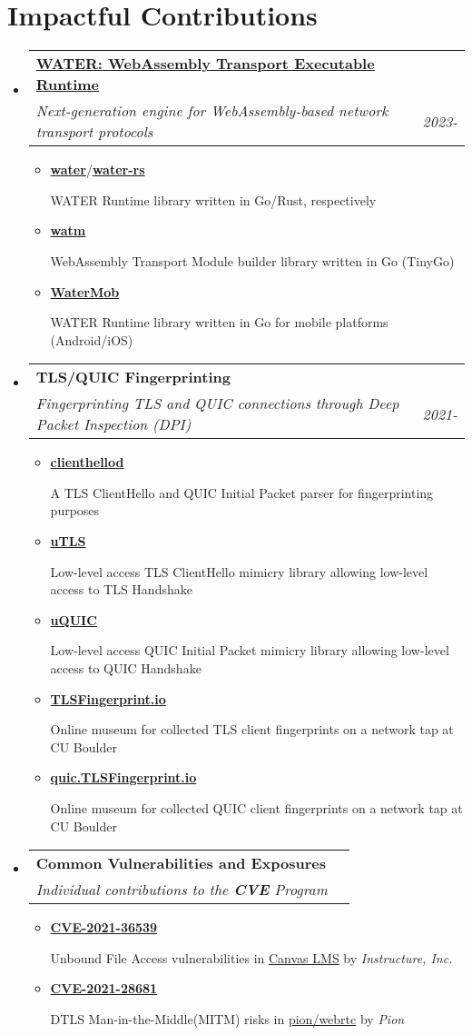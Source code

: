 \documentclass[letterpaper,11pt]{article}
\makeatletter
\newcommand{\resumeItem}[1]{
  \item\small{
    {#1 \vspace{-2pt}}
  }
}
\newcommand{\resumeSubheading}[4]{
  \vspace{-2pt}\item
    \begin{tabular*}{0.97\textwidth}[t]{l@{\extracolsep{\fill}}r}
      \textbf{#1} & #2 \\
      \textit{\small#3} & \textit{\small #4} \\
    \end{tabular*}\vspace{-7pt}
}
\newcommand{\resumeSubHeadingListStart}{\begin{itemize}[leftmargin=0.15in, label={}]}
\newcommand{\resumeSubHeadingListEnd}{\end{itemize}}
\newcommand{\resumeItemListStart}{\begin{itemize}}
\newcommand{\resumeItemListEnd}{\end{itemize}\vspace{-5pt}}
\makeatother
\begin{document}
\section{Impactful Contributions}
\resumeSubHeadingListStart
\resumeSubheading
{\href{https://github.com/refraction-networking/water}{\textbf{WATER: WebAssembly Transport Executable Runtime}}}{}
{Next-generation engine for WebAssembly-based network transport protocols}{2023-}
\resumeItemListStart
  \resumeItem{\href{https://github.com/refraction-networking/water}{\textbf{water}}/\href{https://github.com/refraction-networking/water-rs}{\textbf{water-rs}}}
    {WATER Runtime library written in Go/Rust, respectively}
  \resumeItem{\href{https://github.com/refraction-networking/watm}{\textbf{watm}}}
    {WebAssembly Transport Module builder library written in Go (TinyGo)}
  \resumeItem{\href{https://github.com/gaukas/watermob}{\textbf{WaterMob}}}
    {WATER Runtime library written in Go for mobile platforms (Android/iOS)}
\resumeItemListEnd
\resumeSubheading
{\textbf{TLS/QUIC Fingerprinting}}{}
{Fingerprinting TLS and QUIC connections through Deep Packet Inspection (DPI)}{2021-}
\resumeItemListStart
  \resumeItem{\href{https://github.com/gaukas/clienthellod}{\textbf{clienthellod}}}
    {A TLS ClientHello and QUIC Initial Packet parser for fingerprinting purposes}
  \resumeItem{\href{https://github.com/refraction-networking/utls}{\textbf{uTLS}}}
    {Low-level access TLS ClientHello mimicry library allowing low-level access to TLS Handshake}
  \resumeItem{\href{https://github.com/refraction-networking/uquic}{\textbf{uQUIC}}}
    {Low-level access QUIC Initial Packet mimicry library allowing low-level access to QUIC Handshake}
  \resumeItem{\href{https://tlsfingerprint.io}{\textbf{TLSFingerprint.io}}}
    {Online museum for collected TLS client fingerprints on a network tap at CU Boulder}
  \resumeItem{\href{https://quic.tlsfingerprint.io}{\textbf{quic.TLSFingerprint.io}}}
    {Online museum for collected QUIC client fingerprints on a network tap at CU Boulder}  
\resumeItemListEnd
\resumeSubheading
{\textbf{Common Vulnerabilities and Exposures}}{}
{Individual contributions to the \textbf{CVE\textsuperscript{\textregistered}} Program}{}
\resumeItemListStart
  \resumeItem{\href{https://www.cve.org/CVERecord?id=CVE-2021-36539}{\textbf{CVE-2021-36539}}}
    {Unbound File Access vulnerabilities in \href{https://www.instructure.com/canvas}{Canvas LMS} by \emph{Instructure, Inc.}}
  \resumeItem{\href{https://www.cve.org/CVERecord?id=CVE-2021-28681}{\textbf{CVE-2021-28681}}}
    {DTLS Man-in-the-Middle(MITM) risks in \href{https://github.com/pion/webrtc}{pion/webrtc} by \emph{Pion}}
\resumeItemListEnd
\resumeSubHeadingListEnd
\vspace{1pt}
\end{document}
